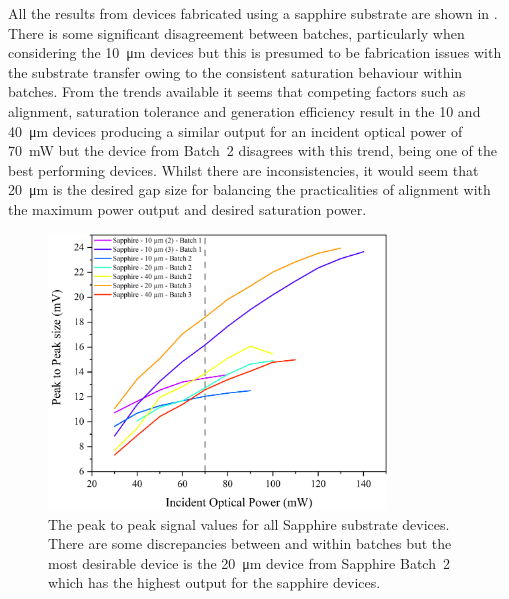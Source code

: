 All the results from devices fabricated using a sapphire substrate are shown in . There is some significant disagreement between batches, particularly when considering the \SI{10}{\micro\metre} devices but this is presumed to be fabrication issues with the substrate transfer owing to the consistent saturation behaviour within batches. From the trends available it seems that competing factors such as alignment, saturation tolerance and generation efficiency result in the 10 and \SI{40}{\micro\metre} devices producing a similar output for an incident optical power of \SI{70}{\milli\watt} but the device from Batch~2 disagrees with this trend, being one of the best performing devices. Whilst there are inconsistencies, it would seem that \SI{20}{\micro\metre} is the desired gap size for balancing the practicalities of alignment with the maximum power output and desired saturation power.

\begin{figure}[h!]
    \centering
    \includegraphics[width=0.8\textwidth]{Figures/Misc/SysDev/OptSapphAllG.png}
    \captionsetup{font = footnotesize, justification = centering}
    \caption[The Peak to Peak Signal Values for all Sapphire Substrate Devices]{The peak to peak signal values for all Sapphire substrate devices. There are some discrepancies between and within batches but the most desirable device is the \SI{20}{\micro\metre} device from Sapphire Batch~2 which has the highest output for the sapphire devices.}
    \label{fig:allsapph}
\end{figure}

